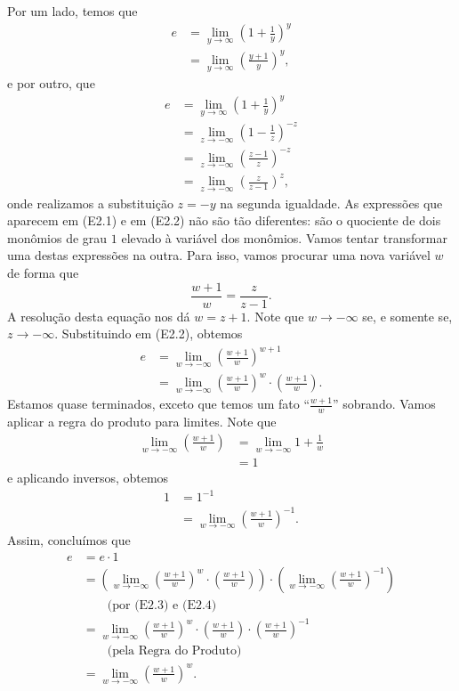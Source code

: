 \begin{itemize}
	Por um lado, temos que
	\begin{align*}
	    e
	        &=\lim_{y\to\infty}\left(1+\frac{1}{y}\right)^y\\
	        &=\lim_{y\to\infty}\left(\frac{y+1}{y}\right)^y,\tag{E2.1}
	\end{align*}
	e por outro, que
	\begin{align*}
	    e
	        &=\lim_{y\to\infty}\left(1+\frac{1}{y}\right)^y\\
	        &=\lim_{z\to-\infty}\left(1-\frac{1}{z}\right)^{-z}\\
	        &=\lim_{z\to-\infty}\left(\frac{z-1}{z}\right)^{-z}\\
	        &=\lim_{z\to-\infty}\left(\frac{z}{z-1}\right)^z\tag{E2.2},
	\end{align*}
	onde realizamos a substituição $z=-y$ na segunda igualdade.	As expressões que aparecem em (E2.1) e em (E2.2) não são tão diferentes: são o quociente de dois monômios de grau $1$ elevado à variável dos monômios. Vamos tentar transformar uma destas expressões na outra. Para isso, vamos procurar uma nova variável $w$ de forma que
	\[\frac{w+1}{w}=\frac{z}{z-1}.\]
	A resolução desta equação nos dá $w=z+1$. Note que $w\to-\infty$ se, e somente se, $z\to-\infty$. Substituindo em (E2.2), obtemos
	\begin{align*}
	    e
	        &=\lim_{w\to-\infty}\left(\frac{w+1}{w}\right)^{w+1}\\
	        &=\lim_{w\to-\infty}\left(\frac{w+1}{w}\right)^w\cdot \left(\frac{w+1}{w}\right).\tag{E2.3}
	\end{align*}
	Estamos quase terminados, exceto que temos um fato ``$\frac{w+1}{w}$'' sobrando. Vamos aplicar a regra do produto para limites. Note que
	\begin{align*}
	    \lim_{w\to-\infty}\left(\frac{w+1}{w}\right)
	        &=\lim_{w\to-\infty}1+\frac{1}{w}\\
	        &=1
	\end{align*}
	e aplicando inversos, obtemos
	\begin{align*}
	    1
	        &=1^{-1}\\
	        &=\lim_{w\to-\infty}\left(\frac{w+1}{w}\right)^{-1}\tag{E2.4}.
	\end{align*}
	Assim, concluímos que
	\begin{align*}
	    e
	        &=e\cdot 1\\
	        &=\left(\lim_{w\to-\infty}\left(\frac{w+1}{w}\right)^w\cdot\left(\frac{w+1}{w}\right)\right)\cdot\left(\lim_{w\to-\infty}\left(\frac{w+1}{w}\right)^{-1}\right)\\
	        &\qquad\text{(por (E2.3) e (E2.4)}\\
	        &=\lim_{w\to-\infty}\left(\frac{w+1}{w}\right)^w\cdot\left(\frac{w+1}{w}\right)\cdot\left(\frac{w+1}{w}\right)^{-1}\\
	        &\qquad\text{(pela Regra do Produto)}\\
	        &=\lim_{w\to-\infty}\left(\frac{w+1}{w}\right)^w.\tag{E2.5}
	\end{align*}
	

\end{itemize}
